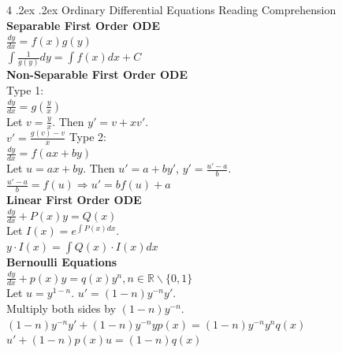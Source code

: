 \documentclass[10pt,landscape,a4paper]{article}
\makeatletter
\renewcommand{\section}{\@startsection{section}{1}{0mm}%
                                {.2ex}%
                                {.2ex}%
                                {\color{myblue}\sffamily\small\bfseries}}
\makeatother
\begin{document}
\begin{multicols*}{4}
\section{Ordinary Differential Equations}
Reading Comprehension\\
\textbf{Separable First Order ODE}\\
$\frac{dy}{dx}=f(x)g(y)$\\
$\int\frac{1}{g(y)}dy=\int f(x)dx+C$\\
\textbf{Non-Separable First Order ODE}\\
Type 1:\\
$\frac{dy}{dx}=g(\frac{y }{x })$\\
Let $v=\frac{y}{x}$. Then $y'=v+xv'$.\\
$v'=\frac{g(v)-v}{x}$
Type 2:\\
$\frac{dy}{dx}=f(ax+by)$\\
Let $u=ax+by$. Then $u'=a+by'$, $y'=\frac{u'-a }{b}$.\\
$\frac{u'-a }{b }=f(u)\Rightarrow u'=bf(u)+a$\\
\textbf{Linear First Order ODE}\\
$\frac{dy}{dx}+P(x)y=Q(x)$\\
Let $I(x)=e^{\int P(x)dx}$.\\
$y\cdot I(x)=\int Q(x)\cdot I(x)dx$\\
\textbf{Bernoulli Equations}\\
$\frac{dy}{dx}+p(x)y=q(x)y^n, n\in\mathbb{R}\backslash\{0,1\}$\\
Let $u=y^{1-n}$. $u'=(1-n)y^{-n}y'$.\\
Multiply both sides by $(1-n)y^{-n}$.\\
$(1-n)y^{-n}y'+(1-n)y^{-n}yp(x)=(1-n)y^{-n}y^nq(x)$\\
$u'+(1-n)p(x)u=(1-n)q(x)$

\end{multicols*}
\end{document}
